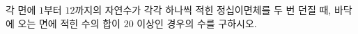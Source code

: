 \hspace*{2mm}\begin{minipage}[t]{\dimexpr\linewidth-2mm\relax}\vspace{0pt}
각 면에 $1$부터 $12$까지의 자연수가 각각 하나씩 적힌 정십이면체를 두 번 던질 때, 바닥에 오는 면에 적힌 수의 합이 $20$ 이상인 경우의 수를 구하시오.\end{minipage}
